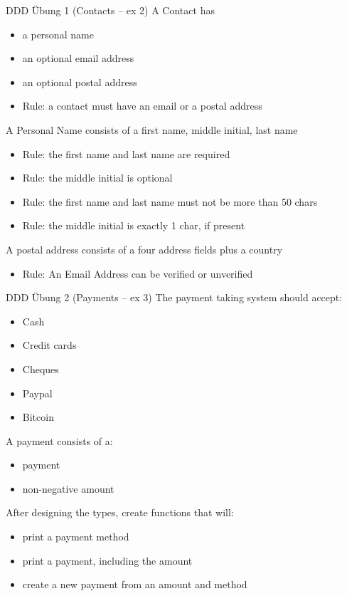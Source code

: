 \documentclass[t]{beamer}
\begin{document}
\begin{frame}[label={sec:org908f591}]{DDD Übung 1 (Contacts -- ex 2)}
A Contact has

\begin{itemize}
\item a personal name
\item an optional email address
\item an optional postal address
\item Rule: a contact must have an email or a postal address
\end{itemize}

A Personal Name consists of a first name, middle initial, last name

\begin{itemize}
\item Rule: the first name and last name are required
\item Rule: the middle initial is optional
\item Rule: the first name and last name must not be more than 50 chars
\item Rule: the middle initial is exactly 1 char, if present
\end{itemize}

A postal address consists of a four address fields plus a country

\begin{itemize}
\item Rule: An Email Address can be verified or unverified
\end{itemize}
\end{frame}

\begin{frame}[label={sec:org0c8e78f}]{DDD Übung 2 (Payments -- ex 3)}
The payment taking system should accept:

\begin{itemize}
\item Cash
\item Credit cards
\item Cheques
\item Paypal
\item Bitcoin
\end{itemize}

A payment consists of a:

\begin{itemize}
\item payment
\item non-negative amount
\end{itemize}

After designing the types, create functions that will:

\begin{itemize}
\item print a payment method
\item print a payment, including the amount
\item create a new payment from an amount and method
\end{itemize}
\end{frame}
\end{document}
